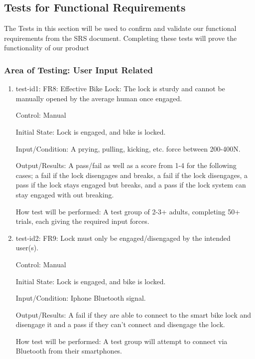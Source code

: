 \documentclass[12pt, titlepage]{article}
\begin{document}
\subsection{Tests for Functional Requirements}
\label{Section 5.1}

The Tests in this section will be used to confirm and validate our functional requirements from the SRS document. Completing these tests will prove the functionality of our product

\subsubsection{Area of Testing: User Input Related}

\begin{enumerate}

\item{test-id1: FR8: Effective Bike Lock: The lock is sturdy and cannot be manually opened by the average human once engaged. \\}

Control: Manual

Initial State: Lock is engaged, and bike is locked.

Input/Condition: A prying, pulling, kicking, etc. force between 200-400N.

Output/Results: A pass/fail as well as a score from 1-4 for the following cases; a fail if the lock disengages and breaks, a fail if the lock disengages, a pass if the lock stays engaged but breaks, and a pass if the lock system can stay engaged with out breaking.

How test will be performed: A test group of 2-3+ adults, completing 50+ trials, each giving the required input forces.

\item{test-id2: FR9: Lock must only be engaged/disengaged by the intended user(s). \\}

Control: Manual

Initial State: Lock is engaged, and bike is locked.

Input/Condition: Iphone Bluetooth signal.

Output/Results: A fail if they are able to connect to the smart bike lock and disengage it and a pass if they can’t connect and disengage the lock.

How test will be performed: A test group will attempt to connect via Bluetooth from their smartphones.

\end{enumerate}
\end{document}
